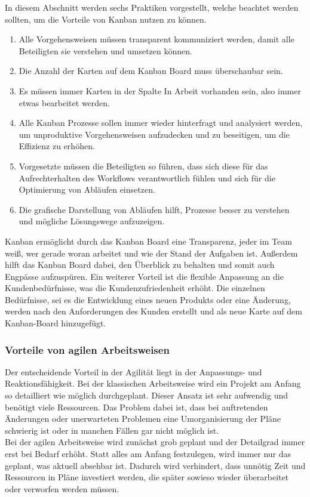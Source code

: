 \documentclass[ngerman]{seminarvorlage}
\begin{document}
In diesem Abschnitt werden sechs Praktiken vorgestellt, welche beachtet werden sollten, um die Vorteile von Kanban nutzen zu können.\cite{Refa.}
\begin{enumerate}
\item Alle Vorgehensweisen müssen transparent kommuniziert werden, damit alle Beteiligten sie verstehen und umsetzen können.
\item Die Anzahl der Karten auf dem Kanban Board muss überschaubar sein.
\item Es müssen immer Karten in der Spalte \glqq In Arbeit\grqq\: vorhanden sein, also immer etwas bearbeitet werden.
\item Alle Kanban Prozesse sollen immer wieder hinterfragt und analysiert werden, um unproduktive Vorgehensweisen aufzudecken und zu beseitigen, um die Effizienz zu erhöhen.
\item Vorgesetzte müssen die Beteiligten so führen, dass sich diese für das Aufrechterhalten des Workflows verantwortlich fühlen und sich für die Optimierung von Abläufen einsetzen.
\item Die grafische Darstellung von Abläufen hilft, Prozesse besser zu verstehen und mögliche Lösungswege aufzuzeigen.
\end{enumerate}

Kanban ermöglicht durch das Kanban Board eine Transparenz, jeder im Team weiß, wer gerade woran arbeitet und wie der Stand der Aufgaben ist. Außerdem hilft das Kanban Board dabei, den Überblick zu behalten und somit auch Engpässe aufzuspüren. Ein weiterer Vorteil ist die flexible Anpassung an die Kundenbedürfnisse, was die Kundenzufriedenheit erhöht. Die einzelnen Bedürfnisse, sei es die Entwicklung eines neuen Produkts oder eine Änderung, werden nach den Anforderungen des Kunden erstellt und als neue Karte auf dem Kanban-Board hinzugefügt.

\subsubsection{Vorteile von agilen Arbeitsweisen}
Der entscheidende Vorteil in der Agilität liegt in der Anpassungs- und Reaktionsfähigkeit. Bei der klassischen Arbeitsweise wird ein Projekt am Anfang so detailliert wie möglich durchgeplant. Dieser Ansatz ist sehr aufwendig und benötigt viele Ressourcen. Das Problem dabei ist, dass bei auftretenden Änderungen oder unerwarteten Problemen eine Umorganisierung der Pläne schwierig ist oder in manchen Fällen gar nicht möglich ist.\\
Bei der agilen Arbeitsweise wird zunächst grob geplant und der Detailgrad immer erst bei Bedarf erhöht. Statt alles am Anfang festzulegen, wird immer nur das geplant, was aktuell absehbar ist. Dadurch wird verhindert, dass unnötig Zeit und Ressourcen in Pläne investiert werden, die später sowieso wieder überarbeitet oder verworfen werden müssen.\cite{Theobald.2021}
\end{document}

